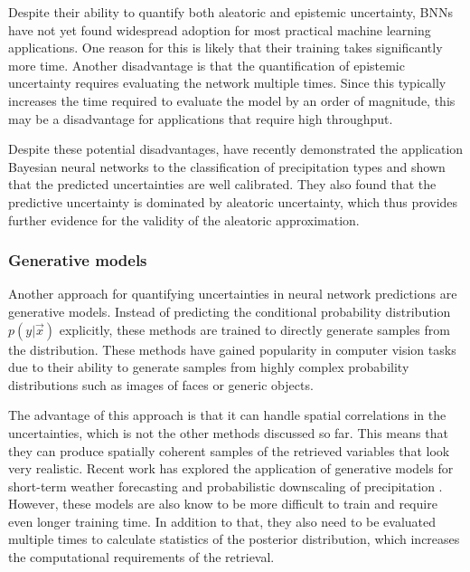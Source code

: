 Despite their ability to quantify both aleatoric and epistemic uncertainty, BNNs
have not yet found widespread adoption for most practical machine learning
applications. One reason for this is likely that their training takes
significantly more time. Another disadvantage is that the quantification of
epistemic uncertainty requires evaluating the network multiple times. Since this
typically increases the time required to evaluate the model by an order of
magnitude, this may be a disadvantage for applications that require high
throughput.

Despite these potential disadvantages, \citet{orescanin22} have recently
demonstrated the application Bayesian neural networks to the classification of
precipitation types and shown that the predicted uncertainties are well
calibrated. They also found that the predictive uncertainty is dominated by
aleatoric uncertainty, which thus provides further evidence for the validity of
the aleatoric approximation.

\subsubsection{Generative models}

Another approach for quantifying uncertainties in neural network predictions are
generative models. Instead of predicting the conditional probability
distribution $p(y|\vec{x})$ explicitly, these methods are trained to directly
generate samples from the distribution. These methods have gained popularity in
computer vision tasks due to their ability to generate samples from highly
complex probability distributions such as images of faces or generic objects.

The advantage of this approach is that it can handle spatial correlations in the
uncertainties, which is not the other methods discussed so far. This means that
they can produce spatially coherent samples of the retrieved variables that look
very realistic. Recent work has explored the application of generative models
for short-term weather forecasting \citep{ravuri21} and probabilistic
downscaling of precipitation \citep{harris22, leinonen20}. However, these models
are also know to be more difficult to train and require even longer training
time. In addition to that, they also need to be evaluated multiple times to
calculate statistics of the posterior distribution, which increases the
computational requirements of the retrieval.
